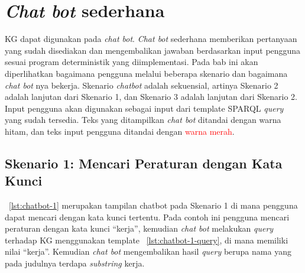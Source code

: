 \section{\textit{Chat bot} sederhana}
\label{sec:chatbot-sederhana}


KG \legal dapat digunakan pada \textit{chat bot}. \textit{Chat bot} sederhana memberikan pertanyaan
yang sudah disediakan dan mengembalikan jawaban berdasarkan input pengguna sesuai program
deterministik yang diimplementasi. Pada bab ini akan diperlihatkan bagaimana pengguna melalui
beberapa skenario dan bagaimana \textit{chat bot} nya bekerja. Skenario \textit{chatbot} adalah
sekuensial, artinya Skenario 2 adalah lanjutan dari Skenario 1, dan Skenario 3 adalah lanjutan dari
Skenario 2. Input pengguna akan digunakan sebagai input dari template SPARQL \textit{query} yang
sudah tersedia. Teks yang ditampilkan \textit{chat bot} ditandai dengan warna hitam, dan teks input
pengguna ditandai dengan \textcolor{red}{warna merah}.

\subsection{Skenario 1: Mencari Peraturan dengan Kata Kunci}
\label{subsec:skenario-1}

\lst~\ref{lst:chatbot-1} merupakan tampilan chatbot pada Skenario 1 di mana pengguna dapat mencari
\legal dengan kata kunci tertentu. Pada contoh ini pengguna mencari peraturan dengan kata kunci
``kerja'', kemudian \textit{chat bot} melakukan \textit{query} terhadap KG menggunakan template
\lst~\ref{lst:chatbot-1-query}, di mana  memiliki nilai ``kerja''. Kemudian
\textit{chat bot} mengembalikan hasil \textit{query} berupa nama \legal yang pada judulnya terdapa
\textit{substring} kerja.

